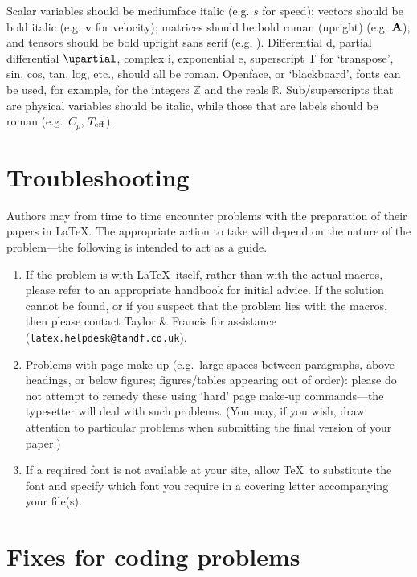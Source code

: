 \documentclass{rQUF2e}
\theoremstyle{plain}
\theoremstyle{definition}
\theoremstyle{remark}
\begin{document}
Scalar  variables should be mediumface italic (e.g. $s$ for
speed); vectors should be bold italic (e.g. $\bm v$ for velocity);
matrices should be bold roman (upright) (e.g. $\bf A$), and
tensors should be bold upright sans serif (e.g. {}). Differential d, partial differential $\upartial$, complex i,
exponential e, superscript T for `transpose', sin, cos, tan, log,
etc., should all be roman. Openface, or `blackboard', fonts can be
used, for example, for the integers $\mathbb Z$ and the reals
$\mathbb R$. Sub/superscripts that are physical variables should
be italic, while those  that are labels should be roman (e.g.\
$C_p$, $T_{\rm eff}$).


\section{Troubleshooting}

Authors may from time to time encounter problems with the  preparation
of their papers in \LaTeX. The appropriate  action  to
take will depend on the nature of the problem---the following is
intended to act as a guide.

\begin{enumerate}
\item[(i)] If the problem is with \LaTeX\ itself, rather than with the
actual macros, please refer to an appropriate handbook for
initial advice. If the solution cannot be found, or if you
suspect that the problem lies with the macros, then please contact
Taylor \& Francis for assistance ({\tt latex.helpdesk@tandf.co.uk}).

\item[(ii)] Problems with page make-up (e.g.\ large spaces between paragraphs,
above headings, or below figures; figures/tables appearing out of order):
please do not attempt to remedy these using `hard' page make-up
commands---the typesetter will deal with such problems. (You may, if you wish,
draw attention to particular problems when submitting the final version of your paper.)

\item[(iii)] If a required font is not available at your site, allow \TeX\
to substitute the font and specify which font you require in a
covering letter accompanying your file(s).
\end{enumerate}


\section{Fixes for coding problems}
\end{document}
